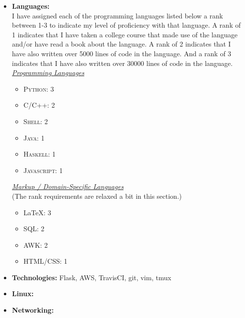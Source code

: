 \documentclass[letterpaper,11pt]{article}
\begin{document}
\begin{itemize}
    \item {\bf Languages:}\\
        I have assigned each of the programming languages listed below a rank between 1-3 to indicate my level of proficiency with that language. A rank of 1 indicates that I have taken a college course that made use of the language and/or have read a book about the language. A rank of 2 indicates that I have also written over 5000 lines of code in the language. And a rank of 3 indicates that I have also written over 30000 lines of code in the language.\\\vspace{0.2cm}
        \textit{\uline{Programming Languages}}\\
        \begin{itemize}
            \item
                \textsc{Python}: 3
            \item
                \textsc{C/C++}: 2
            \item
                \textsc{Shell}: 2
            \item
                \textsc{Java}: 1
            \item
                \textsc{Haskell}: 1
            \item
                \textsc{Javascript}: 1
        \end{itemize}

        \textit{\uline{Markup / Domain-Specific Languages}}\\
        (The rank requirements are relaxed a bit in this section.)
        \begin{itemize}
            \item
                \LaTeX: 3
            \item
                \textsc{SQL}: 2
            \item
                \textsc{AWK}: 2
            \item
                \textsc{HTML/CSS}: 1
        \end{itemize}

    \item {\bf Technologies:} Flask, AWS, TravisCI, git, vim, tmux

    \item {\bf Linux:}

    \item {\bf Networking:}
\end{itemize}
\end{document}

